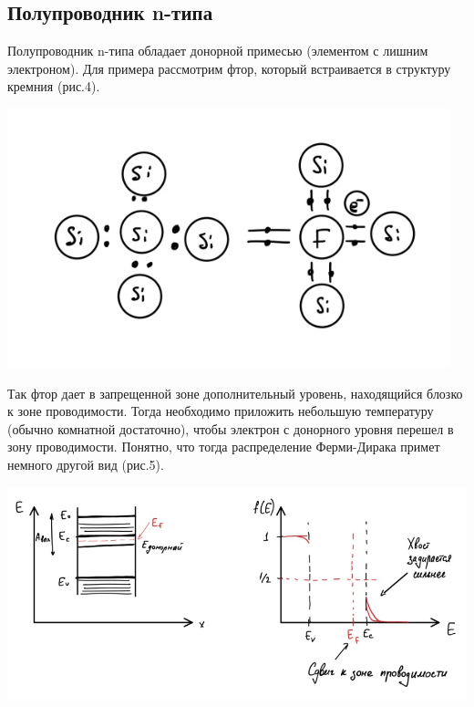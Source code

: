 \documentclass[a4paper]{article}
\begin{document}
\subsection*{Полупроводник n-типа}
Полупроводник n-типа обладает донорной примесью (элементом с лишним электроном). Для примера рассмотрим фтор, который встраивается в структуру кремния (рис.4).
\begin{center}
    \includegraphics[scale = 0.7]{donor.jpg}
\end{center}
Так фтор дает в запрещенной зоне дополнительный уровень, находящийся блозко к зоне проводимости. Тогда необходимо приложить небольшую температуру (обычно комнатной достаточно), чтобы электрон с донорного уровня перешел в зону проводимости. Понятно, что тогда распределение Ферми-Дирака примет немного другой вид (рис.5).

\newpage
\begin{center}
    \includegraphics[scale = 0.7]{n-type.jpg}
\end{center}
\end{document}
